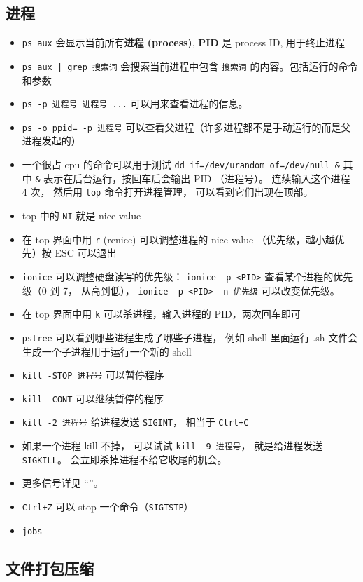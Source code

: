 \subsection{进程}
\begin{itemize}
\item \verb`ps aux` 会显示当前所有\textbf{进程 (process)}, \textbf{PID} 是 process ID, 用于终止进程
\item \verb`ps aux | grep 搜索词` 会搜索当前进程中包含 \verb`搜索词` 的内容。包括运行的命令和参数
\item \verb`ps -p 进程号 进程号 ...` 可以用来查看进程的信息。
\item \verb`ps -o ppid= -p 进程号` 可以查看父进程（许多进程都不是手动运行的而是父进程发起的）
\item 一个很占 cpu 的命令可以用于测试 \verb`dd if=/dev/urandom of=/dev/null &` 其中 \verb`&` 表示在后台运行，按回车后会输出 PID （进程号）。 连续输入这个进程 4 次， 然后用 \verb`top` 命令打开进程管理， 可以看到它们出现在顶部。
\item top 中的 \verb`NI` 就是 nice value
\item 在 top 界面中用 \verb`r` (renice) 可以调整进程的 nice value （优先级，越小越优先）按 ESC 可以退出
\item \verb`ionice` 可以调整硬盘读写的优先级： \verb`ionice -p <PID>` 查看某个进程的优先级（0 到 7， 从高到低）， \verb`ionice -p <PID> -n 优先级` 可以改变优先级。
\item 在 top 界面中用 \verb`k` 可以杀进程，输入进程的 PID，两次回车即可
\item \verb`pstree` 可以看到哪些进程生成了哪些子进程， 例如 shell 里面运行 .sh 文件会生成一个子进程用于运行一个新的 shell
\item \verb`kill -STOP 进程号` 可以暂停程序
\item \verb`kill -CONT` 可以继续暂停的程序
\item \verb`kill -2 进程号` 给进程发送 \verb`SIGINT`， 相当于 \verb`Ctrl+C`
\item 如果一个进程 kill 不掉， 可以试试 \verb`kill -9 进程号`， 就是给进程发送 \verb`SIGKILL`。 会立即杀掉进程不给它收尾的机会。
\item 更多信号详见 “”。
\item \verb`Ctrl+Z` 可以 stop 一个命令（\verb`SIGTSTP`）
\item \verb`jobs` 
\end{itemize}

\subsection{文件打包压缩}
